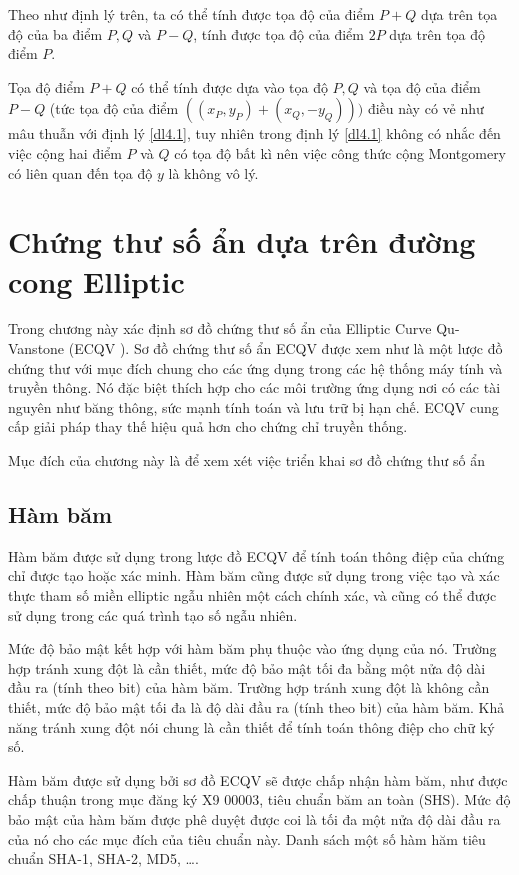 \documentclass[a4paper,12pt]{report}
\begin{document}
Theo như định lý trên, ta có thể tính được tọa độ của điểm $P + Q$ dựa trên tọa độ của ba điểm $P, Q$ và $P-Q$, tính được tọa độ của điểm $2P$ dựa trên tọa độ điểm $P$.

Tọa độ điểm $P+Q$ có thể tính được dựa vào tọa độ $P, Q$ và tọa độ của điểm $P-Q$ (tức tọa độ của điểm $((x_P, y_P) + (x_Q, -y_Q)))$ điều này có vẻ như mâu thuẫn với định lý \ref{dl4.1}, tuy nhiên trong định lý \ref{dl4.1} không có nhắc đến việc cộng hai điểm $P$ và $Q$ có tọa độ bất kì nên việc công thức cộng Montgomery có liên quan đến tọa độ $y$ là không vô lý.
\chapter{Chứng thư số ẩn dựa trên đường cong Elliptic}
Trong chương này xác định sơ đồ chứng thư số ẩn của Elliptic Curve Qu-Vanstone (ECQV ). Sơ đồ chứng thư số ẩn ECQV được xem như là một lược đồ chứng thư với mục đích chung cho các ứng dụng trong các hệ thống máy tính và truyền thông. Nó đặc biệt thích hợp cho các môi trường ứng dụng nơi có các tài nguyên như băng thông, sức mạnh tính toán và lưu trữ bị hạn chế. ECQV cung cấp giải pháp thay thế hiệu quả hơn cho chứng chỉ truyền thống.

Mục đích của chương này là để xem xét việc triển khai sơ đồ chứng thư số ẩn 
\section{Hàm băm}
Hàm băm được sử dụng trong lược đồ ECQV để tính toán thông điệp của chứng chỉ được tạo hoặc xác minh. Hàm băm cũng được sử dụng trong việc tạo và xác thực tham số miền elliptic ngẫu nhiên một cách chính xác, và cũng có thể được sử dụng trong các quá trình tạo số ngẫu nhiên.

Mức độ bảo mật kết hợp với hàm băm phụ thuộc vào ứng dụng của nó. Trường hợp tránh xung đột là cần thiết, mức độ bảo mật tối đa bằng một nửa độ dài đầu ra (tính theo bit) của hàm băm. Trường hợp tránh xung đột là không cần thiết, mức độ bảo mật tối đa là độ dài đầu ra (tính theo bit) của hàm băm. Khả năng tránh xung đột nói chung là cần thiết để tính toán thông điệp cho chữ ký số.

Hàm băm được sử dụng bởi sơ đồ ECQV sẽ được chấp nhận hàm băm, như được chấp thuận trong mục đăng ký X9 00003, tiêu chuẩn băm an toàn (SHS). Mức độ bảo mật của hàm băm được phê duyệt được coi là tối đa một nửa độ dài đầu ra của nó cho các mục đích của tiêu chuẩn này. Danh sách một số hàm hăm tiêu chuẩn SHA-1, SHA-2, MD5, \ldots.
\end{document}
